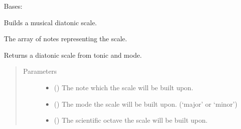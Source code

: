 \documentclass[letterpaper,10pt,english]{sphinxmanual}
\begin{document}

\begin{fulllineitems}
\label{\detokenize{index:birdears.scale.DiatonicScale}}
Bases: {\hyperref[\detokenize{index:birdears.scale.ScaleBase}]{}}

Builds a musical diatonic scale.

\begin{fulllineitems}
\label{\detokenize{index:birdears.scale.DiatonicScale.scale}}
 \textendash{} The array of notes representing the scale.

\end{fulllineitems}


\begin{fulllineitems}
\label{\detokenize{index:birdears.scale.DiatonicScale.__init__}}
Returns a diatonic scale from tonic and mode.
\begin{quote}\begin{description}
\item[{Parameters}] \leavevmode\begin{itemize}
\item {} 
 () \textendash{} The note which the scale will be built upon.

\item {} 
 () \textendash{} The mode the scale will be built upon.
(‘major’ or ‘minor’)

\item {} 
 () \textendash{} The scientific octave the scale will be built upon.


\end{itemize}
\end{description}
\end{quote}
\end{fulllineitems}
\end{fulllineitems}
\end{document}
